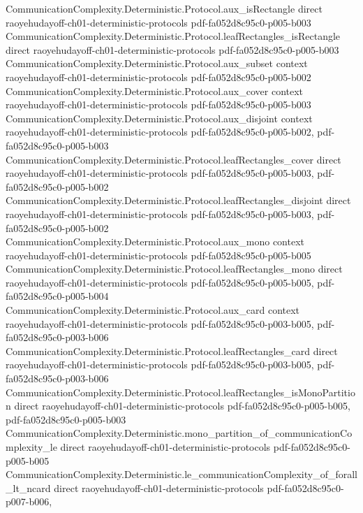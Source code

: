 \begin{theorem}
\proofstep
  {CommunicationComplexity.Deterministic.Protocol.aux_isRectangle}
  {direct}
  {raoyehudayoff-ch01-deterministic-protocols}
  {pdf-fa052d8c95c0-p005-b003}
\proofstep
  {CommunicationComplexity.Deterministic.Protocol.leafRectangles_isRectangle}
  {direct}
  {raoyehudayoff-ch01-deterministic-protocols}
  {pdf-fa052d8c95c0-p005-b003}
\proofstep
  {CommunicationComplexity.Deterministic.Protocol.aux_subset}
  {context}
  {raoyehudayoff-ch01-deterministic-protocols}
  {pdf-fa052d8c95c0-p005-b002}
\proofstep
  {CommunicationComplexity.Deterministic.Protocol.aux_cover}
  {context}
  {raoyehudayoff-ch01-deterministic-protocols}
  {pdf-fa052d8c95c0-p005-b003}
\proofstep
  {CommunicationComplexity.Deterministic.Protocol.aux_disjoint}
  {context}
  {raoyehudayoff-ch01-deterministic-protocols}
  {pdf-fa052d8c95c0-p005-b002,
    pdf-fa052d8c95c0-p005-b003}
\proofstep
  {CommunicationComplexity.Deterministic.Protocol.leafRectangles_cover}
  {direct}
  {raoyehudayoff-ch01-deterministic-protocols}
  {pdf-fa052d8c95c0-p005-b003,
    pdf-fa052d8c95c0-p005-b002}
\proofstep
  {CommunicationComplexity.Deterministic.Protocol.leafRectangles_disjoint}
  {direct}
  {raoyehudayoff-ch01-deterministic-protocols}
  {pdf-fa052d8c95c0-p005-b003,
    pdf-fa052d8c95c0-p005-b002}
\proofstep
  {CommunicationComplexity.Deterministic.Protocol.aux_mono}
  {context}
  {raoyehudayoff-ch01-deterministic-protocols}
  {pdf-fa052d8c95c0-p005-b005}
\proofstep
  {CommunicationComplexity.Deterministic.Protocol.leafRectangles_mono}
  {direct}
  {raoyehudayoff-ch01-deterministic-protocols}
  {pdf-fa052d8c95c0-p005-b005,
    pdf-fa052d8c95c0-p005-b004}
\proofstep
  {CommunicationComplexity.Deterministic.Protocol.aux_card}
  {context}
  {raoyehudayoff-ch01-deterministic-protocols}
  {pdf-fa052d8c95c0-p003-b005,
    pdf-fa052d8c95c0-p003-b006}
\proofstep
  {CommunicationComplexity.Deterministic.Protocol.leafRectangles_card}
  {direct}
  {raoyehudayoff-ch01-deterministic-protocols}
  {pdf-fa052d8c95c0-p003-b005,
    pdf-fa052d8c95c0-p003-b006}
\proofstep
  {CommunicationComplexity.Deterministic.Protocol.leafRectangles_isMonoPartition}
  {direct}
  {raoyehudayoff-ch01-deterministic-protocols}
  {pdf-fa052d8c95c0-p005-b005,
    pdf-fa052d8c95c0-p005-b003}
\proofstep
  {CommunicationComplexity.Deterministic.mono_partition_of_communicationComplexity_le}
  {direct}
  {raoyehudayoff-ch01-deterministic-protocols}
  {pdf-fa052d8c95c0-p005-b005}
\proofstep
  {CommunicationComplexity.Deterministic.le_communicationComplexity_of_forall_lt_ncard}
  {direct}
  {raoyehudayoff-ch01-deterministic-protocols}
  {pdf-fa052d8c95c0-p007-b006,
}
\end{theorem}
